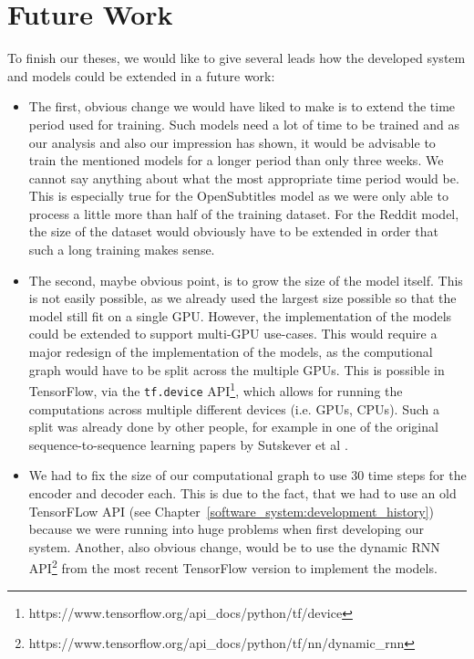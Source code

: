 \chapter{Future Work}

To finish our theses, we would like to give several leads how the developed system and models could be extended in a future work:

\begin{itemize}
  \item The first, obvious change we would have liked to make is to extend the time period used for training. Such models need a lot of time to be trained and as our analysis and also our impression has shown, it would be advisable to train the mentioned models for a longer period than only three weeks. We cannot say anything about what the most appropriate time period would be. This is especially true for the OpenSubtitles model as we were only able to process a little more than half of the training dataset. For the Reddit model, the size of the dataset would obviously have to be extended in order that such a long training makes sense.
  
  \item The second, maybe obvious point, is to grow the size of the model itself. This is not easily possible, as we already used the largest size possible so that the model still fit on a single GPU. However, the implementation of the models could be extended to support multi-GPU use-cases. This would require a major redesign of the implementation of the models, as the computional graph would have to be split across the multiple GPUs. This is possible in TensorFlow, via the \texttt{tf.device} API\footnote{https://www.tensorflow.org/api_docs/python/tf/device}, which allows for running the computations across multiple different devices (i.e. GPUs, CPUs). Such a split was already done by other people, for example in one of the original sequence-to-sequence learning papers by Sutskever et al \cite{Sutskever:2014}.

  \item We had to fix the size of our computational graph to use 30 time steps for the encoder and decoder each. This is due to the fact, that we had to use an old TensorFLow API (see Chapter~\ref{software_system:development_history}) because we were running into huge problems when first developing our system. Another, also obvious change, would be to use the dynamic RNN API\footnote{https://www.tensorflow.org/api_docs/python/tf/nn/dynamic_rnn} from the most recent TensorFlow version to implement the models.
  

\end{itemize}
